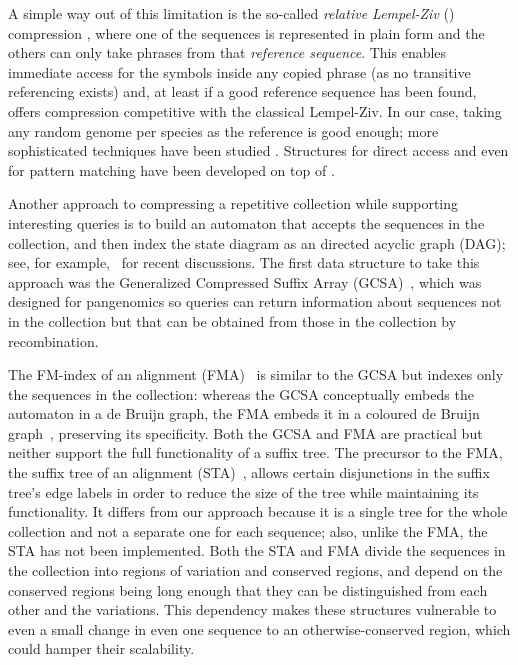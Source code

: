 A simple way out of this limitation is the so-called \emph{relative Lempel-Ziv}
(\RLZ) compression \cite{Kuruppu2010}, where one of the sequences is represented
in plain form and the others can only take phrases from that \emph{reference
sequence}. This enables immediate access for the symbols inside any copied
phrase (as no transitive referencing exists) and, at least if a good reference
sequence has been found, offers compression competitive with the
classical Lempel-Ziv. In our case, taking any random genome per species as the
reference is good enough; more sophisticated techniques have been studied
\cite{KPZ11,KBSCZ12,LPMW16}. Structures for direct access \cite{DG11,Ferrada2014}
and even for pattern matching \cite{DJSS14} have been developed
on top of \RLZ.

Another approach to compressing a repetitive collection while supporting interesting queries is to build an automaton that accepts the sequences in the collection, and then index the state diagram as an directed acyclic graph (DAG); see, for example,~\cite{MaciucaEtAl16,PatenEtAl17,Siren17} for recent discussions.  The first data structure to take this approach was the Generalized Compressed Suffix Array (GCSA)~\cite{SVM14,Siren17}, which was designed for pangenomics so queries can return information about sequences not in the collection but that can be obtained from those in the collection by recombination.

The FM-index of an alignment (FMA)~\cite{NaKPLLMP16,NaEtAl17} is similar to the GCSA but indexes only the sequences in the collection: whereas the GCSA conceptually embeds the automaton in a de Bruijn graph, the FMA embeds it in a coloured de Bruijn graph~\cite{IqbalEtAl12}, preserving its specificity.  Both the GCSA and FMA are practical but neither support the full functionality of a suffix tree.  The precursor to the FMA, the suffix tree of an alignment (STA)~\cite{NPCHIMP13,NPLHLMP13}, allows certain disjunctions in the suffix tree's edge labels in order to reduce the size of the tree while maintaining its functionality.  It differs from our approach because it is a single tree for the whole collection and not a separate one for each sequence; also, unlike the FMA, the STA has not been implemented.  Both the STA and FMA divide the sequences in the collection into regions of variation and conserved regions, and depend on the conserved regions being long enough that they can be distinguished from each other and the variations.  This dependency makes these structures vulnerable to even a small change in even one sequence to an otherwise-conserved region, which could hamper their scalability.

